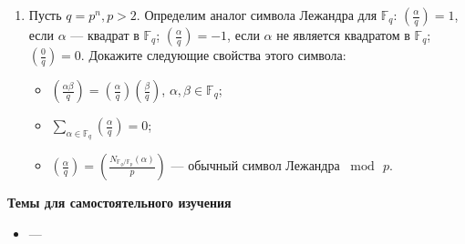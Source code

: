\documentclass[a4paper, 11pt]{article}
\begin{document}
\begin{enumerate}[topsep=0pt]
    \item Пусть $q=p^n, p>2$. Определим аналог символа Лежандра для $\mathbb{F}_q$: $\left(\frac{\alpha}{q}\right)=1$, если $\alpha$ --- квадрат в $\mathbb{F}_q$; $\left(\frac{\alpha}{q}\right)=-1$, если $\alpha$ не является квадратом в $\mathbb{F}_q$; $\left(\frac{0}{q}\right)=0$. Докажите следующие свойства этого символа: 
    \begin{itemize} [topsep=0pt]
        \item $\left(\frac{\alpha\beta}{q}\right) = \left(\frac{\alpha}{q}\right)\left(\frac{\beta}{q}\right)$, $\alpha, \beta \in \mathbb{F}_q$; 
        \item $\sum_{\alpha\in\mathbb{F}_q} \left(\frac{\alpha}{q}\right) = 0$; 
        \item $\left(\frac{\alpha}{q}\right)=\left(\frac{N_{\mathbb{F}_q/\mathbb{F}_p}(\alpha)}{p}\right)$ --- обычный символ Лежандра $\bmod\, p$.
    \end{itemize} %
\end{enumerate}


\noindent\textbf{Темы для самостоятельного изучения}
\begin{itemize}[topsep=0pt]
    \item ---
\end{itemize}
\end{document}
